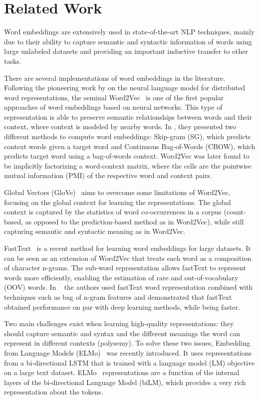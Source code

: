 \documentclass{article}
\begin{document}
\section{Related Work}
\label{sec:related-word}

Word embeddings are extensively used in state-of-the-art NLP techniques, mainly due to their ability to capture semantic and syntactic information of words using large unlabeled datasets and providing an important inductive transfer to other tasks.

There are several implementations of word embeddings in the literature. Following the pioneering work by \cite{Bengio2003} on the neural language model for distributed word representations, the seminal Word2Vec~\cite{mikolov2013distributed} is one of the first popular approaches of word embeddings based on neural networks. This type of representation is able to preserve semantic relationships between words and their context, where context is modeled by nearby words. In \cite{mikolov2013distributed}, they presented two different methods to compute word embeddings: Skip-gram (SG), which predicts context words given a target word and Continuous Bag-of-Words (CBOW), which predicts target word using a bag-of-words context. Word2Vec was later found \cite{NIPS2014_5477} to be implicitly factorizing a word-context matrix, where the cells are the pointwise mutual information (PMI) of the respective word and context pairs.

Global Vectors (GloVe)~\cite{pennington2014glove} aims to overcome some limitations of Word2Vec, focusing on the global context for learning the representations. The global context is captured by the statistics of word co-occurrences in a corpus (count-based, as opposed to the prediction-based method as in Word2Vec), while still capturing semantic and syntactic meaning as in Word2Vec.

FastText~\cite{bojanowski2016enriching} is a recent method for learning word embeddings for large datasets. It can be seen as an extension of Word2Vec that treats each word as a composition of character n-grams. The sub-word representation allows fastText to represent words more efficiently, enabling the estimation of rare and out-of-vocabulary (OOV) words. In ~\cite{joulin2016bag} the authors used fastText word representation combined with techniques such as bag of n-gram features and demonstrated that fastText obtained performance on par with deep learning methods, while being faster.

Two main challenges exist when learning high-quality representations: they should capture semantic and syntax and the different meanings the word can represent in different contexts (polysemy). To solve these two issues, Embedding from Language Models (ELMo)~\cite{peters2018deep} was recently introduced. It uses representations from a bi-directional LSTM that is trained with a language model (LM) objective on a large text dataset. ELMo~\cite{peters2018deep} representations are a function of the internal layers of the bi-directional Language Model (biLM), which provides a very rich representation about the tokens.
\end{document}
